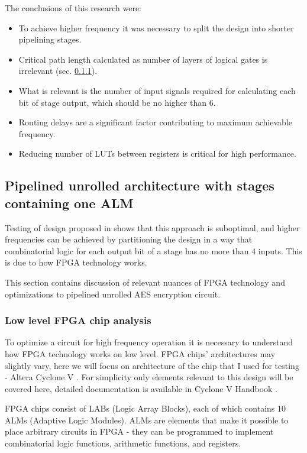 The conclusions of this research were:
\begin{itemize}
\item To achieve higher frequency it was necessary to split the design into shorter pipelining stages.
\item Critical path length calculated as number of layers of logical gates is irrelevant (sec. \ref{sec:low-level-fpga}).
\item What is relevant is the number of input signals required for calculating each bit of stage output, which should be no higher than 6.
\item Routing delays are a significant factor contributing to maximum achievable frequency.
\item Reducing number of LUTs between registers is critical for high performance.
\end{itemize}


\subsection{Pipelined unrolled architecture with stages containing one ALM}
Testing of design proposed in \cite{vlsi} shows that this approach is suboptimal, and higher frequencies can be achieved by partitioning the design in a way that combinatorial logic for each output bit of a stage has no more than 4 inputs. This is due to how FPGA technology works. 

This section contains discussion of relevant nuances of FPGA technology and optimizations to pipelined unrolled AES encryption circuit.

\subsubsection{Low level FPGA chip analysis}
\label{sec:low-level-fpga}
To optimize a circuit for high frequency operation it is necessary to understand how FPGA technology works on low level. FPGA chips' architectures may slightly vary, here we will focus on architecture of the chip that I used for testing - Altera Cyclone V \cite[Chapter 1]{altera-vol1}. For simplicity only elements relevant to this design will be covered here, detailed documentation is available in Cyclone V Handbook \cite{altera-vol1}.

FPGA chips consist of LABs (Logic Array Blocks), each of which contains 10 ALMs (Adaptive Logic Modules). ALMs are elements that make it possible to place arbitrary circuits in FPGA - they can be programmed to implement combinatorial logic functions, arithmetic functions, and registers.

